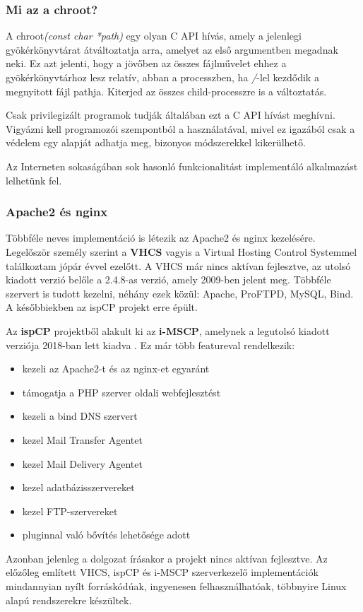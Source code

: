 \subsubsection{Mi az a chroot?} \label{ref:chroot}
A chroot\textit{(const char *path)} egy olyan C API hívás, amely a jelenlegi gyökérkönyvtárat átváltoztatja arra, amelyet az első argumentben megadnak neki. Ez azt jelenti, hogy a jövőben az összes fájlművelet ehhez a gyökérkönyvtárhoz lesz relatív, abban a processzben, ha \textit{/}-lel kezdődik a megnyitott fájl pathja. Kiterjed az összes child-processzre is a változtatás. \cite{chroot}

Csak privilegizált programok tudják általában ezt a C API hívást meghívni. Vigyázni kell programozói szempontból a használatával, mivel ez igazából csak a védelem egy alapját adhatja meg, bizonyos módszerekkel kikerülhető.

Az Interneten sokaságában sok hasonló funkcionalitást implementáló alkalmazást lelhetünk fel.

\subsubsection{Apache2 és nginx}
Többféle neves implementáció is létezik az Apache2 és nginx kezelésére. Legelőször személy szerint a \textbf{VHCS} vagyis a Virtual Hosting Control Systemmel találkoztam jópár évvel ezelőtt. A VHCS már nincs aktívan fejlesztve, az utolsó kiadott verzió belőle a 2.4.8-as verzió, amely 2009-ben jelent meg. \cite{vhcs} Többféle szervert is tudott kezelni, néhány ezek közül: Apache, ProFTPD, MySQL, Bind. A későbbiekben az ispCP projekt erre épült. \cite{ispcp} 

Az \textbf{ispCP} projektből alakult ki az \textbf{i-MSCP}, amelynek a legutolsó kiadott verziója 2018-ban lett kiadva \cite{imscp}. Ez már több featureval rendelkezik:
\begin{itemize}
	\item kezeli az Apache2-t és az nginx-et egyaránt
	\item támogatja a PHP szerver oldali webfejlesztést
	\item kezeli a bind DNS szervert
	\item kezel Mail Transfer Agentet
	\item kezel Mail Delivery Agentet
	\item kezel adatbázisszervereket
	\item kezel FTP-szervereket
	\item pluginnal való bővítés lehetősége adott
\end{itemize}
Azonban jelenleg a dolgozat írásakor a projekt nincs aktívan fejlesztve. Az előzőleg említett VHCS, ispCP és i-MSCP szerverkezelő implementációk mindannyian nyílt forráskódúak, ingyenesen felhasználhatóak, többnyire Linux alapú rendszerekre készültek.


